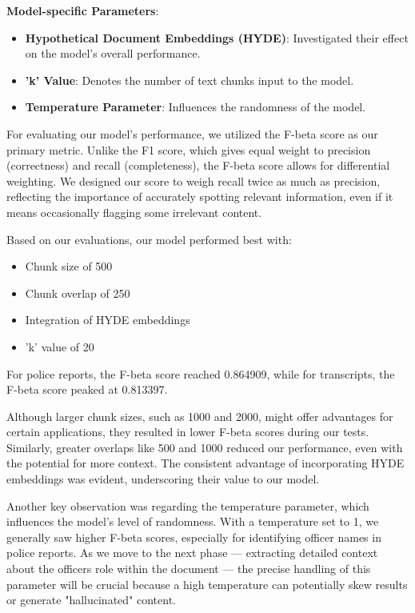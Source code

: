 \documentclass{article}
\begin{document}
\noindent \textbf{Model-specific Parameters}:
\begin{itemize}
    \item \textbf{Hypothetical Document Embeddings (HYDE)}: Investigated their effect on the model's overall performance.
    \item \textbf{'k' Value}: Denotes the number of text chunks input to the model.
    \item \textbf{Temperature Parameter}: Influences the randomness of the model.
\end{itemize}

For evaluating our model's performance, we utilized the F-beta score as our primary metric. Unlike the F1 score, which gives equal weight to precision (correctness) and recall (completeness), the F-beta score allows for differential weighting. We designed our score to weigh recall twice as much as precision, reflecting the importance of accurately spotting relevant information, even if it means occasionally flagging some irrelevant content.

Based on our evaluations, our model performed best with:
\begin{itemize}
    \item Chunk size of 500
    \item Chunk overlap of 250
    \item Integration of HYDE embeddings
    \item 'k' value of 20
\end{itemize}

For police reports, the F-beta score reached 0.864909, while for transcripts, the F-beta score peaked at 0.813397.

Although larger chunk sizes, such as 1000 and 2000, might offer advantages for certain applications, they resulted in lower F-beta scores during our tests. Similarly, greater overlaps like 500 and 1000 reduced our performance, even with the potential for more context. The consistent advantage of incorporating HYDE embeddings was evident, underscoring their value to our model.

Another key observation was regarding the temperature parameter, which influences the model's level of randomness. With a temperature set to 1, we generally saw higher F-beta scores, especially for identifying officer names in police reports. As we move to the next phase — extracting detailed context about the officers role within the document — the precise handling of this parameter will be crucial because a high temperature can potentially skew results or generate "hallucinated" content.
\end{document}
